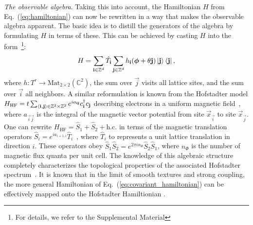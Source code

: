 \documentclass[
    10pt,
    aps,
    prr,
    twocolumn,
    floatfix,
    superscriptaddress
]{revtex4-2}
\newcommand{\revise}[1]{{\color{red} #1}}
\begin{document}

\revise{{\it The observable algebra}}. Taking this into account, the Hamiltonian $H$ from Eq.~(\ref{eq:hamiltonian}) can now be rewritten in a way that makes the observable algebra apparent.
The basic idea is to distill the generators of the algebra by formulating $H$ in terms of these.
This can be achieved by casting $H$ into the form~\footnote{For details, we refer to the Supplemental Material}:
\begin{equation}
    H =  \sum_{\mathbf{i} \in \mathbb{Z}^d} \hat{T}_{\mathbf{i}}  \sum_{\mathbf{j} \in \mathbb{Z}^d} h_{\mathbf{i}}( \boldsymbol{\phi} + \theta \mathbf{j} ) \ket{ \mathbf{j}} \bra{ \mathbf{j}} ,
    \label{eq:covariant_hamiltonian}
\end{equation}
where $h\colon T^r \to \mathrm{Mat}_{2\times2} (\mathbb{C}^2)$,
the sum over $\vec{j}$ visits all lattice sites, and the sum over $\vec{i}$ all neighbors.
A similar reformulation is known from the Hofstadter model $H_\mathrm{HF} = t \sum_{\braket{\mathbf{i},\mathbf{j}} \in \mathbb{Z}^{2} \times \mathbb{Z}^2}e^{i a_{\mathbf{i} \mathbf{j}}} c_{\mathbf{i}}^\dagger c_{\mathbf{j}} $ describing electrons in a uniform magnetic field~\cite{Hofstadter1976}, where $a_{\vec{i} \vec{j}}$ is the integral of the magnetic vector potential from site $\vec{x}_\vec{i}$ to site $\vec{x}_\vec{j}$.
One can rewrite $H_\mathrm{HF} = \hat{S}_1 +  \hat{S}_2 + \mathrm{h.c.} $ in terms of the magnetic translation operators $\hat{S}_i = e^{i a_{i+1,i}} \hat{T}_i$~\cite{Zak1964}, where $\hat{T}_i$ to represents a unit lattice translation in direction $i$.
These operators obey $\hat{S}_1 \hat{S}_2 = e^{2\pi i n_\Phi} \hat{S}_2 \hat{S}_1$, where $n_\Phi$ is the number of magnetic flux quanta per unit cell.
The knowledge of this algebraic structure completely characterizes the topological properties of the associated Hofstadter spectrum~\cite{Hofstadter1976, Bellissard1994, Prodan2016}.
It is known that in the limit of smooth textures and strong coupling, the more general Hamiltonian of Eq.~(\ref{eq:covariant_hamiltonian}) can be effectively mapped onto the Hofstadter Hamiltionian \cite{Hamamoto2015,Su2020}.
\end{document}
